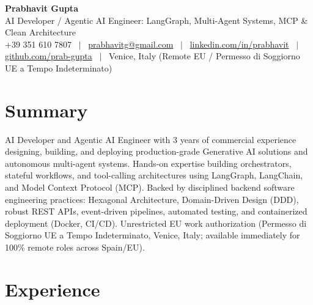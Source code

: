 \documentclass[a4paper,10pt]{article}
\begin{document}
\begin{minipage}[c]{0.80\textwidth}
  {\Huge\bfseries Prabhavit Gupta}\\[3pt]
  {\color{accent}\large AI Developer / Agentic AI Engineer: LangGraph, Multi-Agent Systems, MCP \& Clean Architecture}\\[6pt]
  {\footnotesize +39 351 610 7807 ~$\vert$~
  \href{mailto:prabhavitg@gmail.com}{prabhavitg@gmail.com} ~$\vert$~
  \href{https://www.linkedin.com/in/prabhavit/}{linkedin.com/in/prabhavit} ~$\vert$~
  \href{https://github.com/prab-gupta}{github.com/prab-gupta} ~$\vert$~
  Venice, Italy (Remote EU / Permesso di Soggiorno UE a Tempo Indeterminato)}
\end{minipage}\hfill

\section{Summary}
AI Developer and Agentic AI Engineer with 3 years of commercial experience designing, building, and deploying production-grade Generative AI solutions and autonomous multi-agent systems. Hands-on expertise building orchestrators, stateful workflows, and tool-calling architectures using LangGraph, LangChain, and Model Context Protocol (MCP). Backed by disciplined backend software engineering practices: Hexagonal Architecture, Domain-Driven Design (DDD), robust REST APIs, event-driven pipelines, automated testing, and containerized deployment (Docker, CI/CD). Unrestricted EU work authorization (Permesso di Soggiorno UE a Tempo Indeterminato, Venice, Italy; available immediately for 100\% remote roles across Spain/EU).

\section{Experience}
\end{document}

